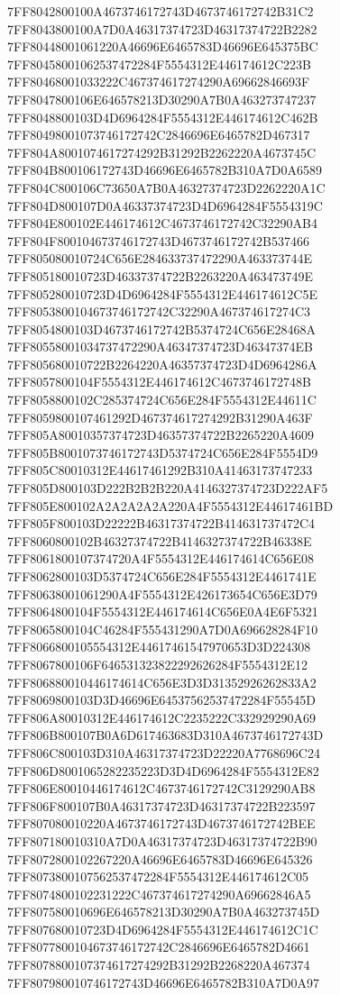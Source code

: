 7FF8042800100A4673746172743D4673746172742B31C2
7FF8043800100A7D0A46317374723D46317374722B2282
7FF80448001061220A46696E6465783D46696E645375BC
7FF80458001062537472284F5554312E446174612C223B
7FF80468001033222C467374617274290A69662846693F
7FF8047800106E646578213D30290A7B0A463273747237
7FF8048800103D4D6964284F5554312E446174612C462B
7FF80498001073746172742C2846696E6465782D467317
7FF804A8001074617274292B31292B2262220A4673745C
7FF804B800106172743D46696E6465782B310A7D0A6589
7FF804C800106C73650A7B0A46327374723D2262220A1C
7FF804D800107D0A46337374723D4D6964284F5554319C
7FF804E800102E446174612C4673746172742C32290AB4
7FF804F800104673746172743D4673746172742B537466
7FF805080010724C656E284633737472290A463373744E
7FF805180010723D46337374722B2263220A463473749E
7FF805280010723D4D6964284F5554312E446174612C5E
7FF8053800104673746172742C32290A467374617274C3
7FF8054800103D4673746172742B5374724C656E28468A
7FF80558001034737472290A46347374723D46347374EB
7FF805680010722B2264220A46357374723D4D6964286A
7FF8057800104F5554312E446174612C4673746172748B
7FF8058800102C285374724C656E284F5554312E44611C
7FF8059800107461292D467374617274292B31290A463F
7FF805A80010357374723D46357374722B2265220A4609
7FF805B8001073746172743D5374724C656E284F5554D9
7FF805C80010312E44617461292B310A41463173747233
7FF805D800103D222B2B2B220A4146327374723D222AF5
7FF805E800102A2A2A2A2A220A4F5554312E44617461BD
7FF805F800103D22222B46317374722B414631737472C4
7FF8060800102B46327374722B4146327374722B46338E
7FF8061800107374720A4F5554312E446174614C656E08
7FF8062800103D5374724C656E284F5554312E4461741E
7FF80638001061290A4F5554312E426173654C656E3D79
7FF8064800104F5554312E446174614C656E0A4E6F5321
7FF8065800104C46284F555431290A7D0A696628284F10
7FF8066800105554312E44617461547970653D3D224308
7FF8067800106F646531323822292626284F5554312E12
7FF806880010446174614C656E3D3D31352926262833A2
7FF8069800103D3D46696E64537562537472284F55545D
7FF806A80010312E446174612C2235222C332929290A69
7FF806B800107B0A6D617463683D310A4673746172743D
7FF806C800103D310A46317374723D22220A7768696C24
7FF806D8001065282235223D3D4D6964284F5554312E82
7FF806E80010446174612C4673746172742C3129290AB8
7FF806F800107B0A46317374723D46317374722B223597
7FF807080010220A4673746172743D4673746172742BEE
7FF807180010310A7D0A46317374723D46317374722B90
7FF8072800102267220A46696E6465783D46696E645326
7FF8073800107562537472284F5554312E446174612C05
7FF8074800102231222C467374617274290A69662846A5
7FF807580010696E646578213D30290A7B0A463273745D
7FF807680010723D4D6964284F5554312E446174612C1C
7FF8077800104673746172742C2846696E6465782D4661
7FF8078800107374617274292B31292B2268220A467374
7FF807980010746172743D46696E6465782B310A7D0A97
